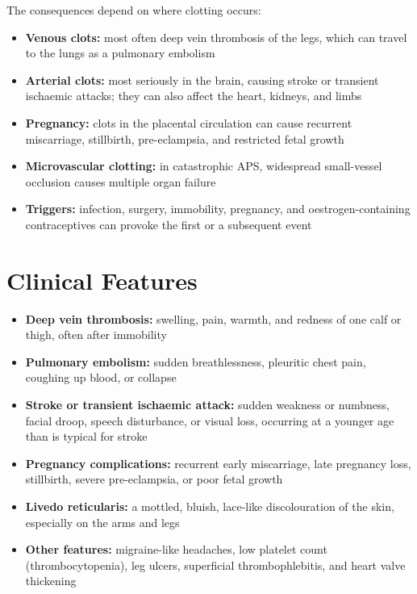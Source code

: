 The consequences depend on where clotting occurs:

\begin{itemize}
    \item \textbf{Venous clots:} most often deep vein thrombosis of the legs, which can travel to the lungs as a pulmonary embolism
    \item \textbf{Arterial clots:} most seriously in the brain, causing stroke or transient ischaemic attacks; they can also affect the heart, kidneys, and limbs
    \item \textbf{Pregnancy:} clots in the placental circulation can cause recurrent miscarriage, stillbirth, pre-eclampsia, and restricted fetal growth
    \item \textbf{Microvascular clotting:} in catastrophic APS, widespread small-vessel occlusion causes multiple organ failure
    \item \textbf{Triggers:} infection, surgery, immobility, pregnancy, and oestrogen-containing contraceptives can provoke the first or a subsequent event
\end{itemize}

\section*{Clinical Features}
\begin{itemize}
    \item \textbf{Deep vein thrombosis:} swelling, pain, warmth, and redness of one calf or thigh, often after immobility
    \item \textbf{Pulmonary embolism:} sudden breathlessness, pleuritic chest pain, coughing up blood, or collapse
    \item \textbf{Stroke or transient ischaemic attack:} sudden weakness or numbness, facial droop, speech disturbance, or visual loss, occurring at a younger age than is typical for stroke
    \item \textbf{Pregnancy complications:} recurrent early miscarriage, late pregnancy loss, stillbirth, severe pre-eclampsia, or poor fetal growth
    \item \textbf{Livedo reticularis:} a mottled, bluish, lace-like discolouration of the skin, especially on the arms and legs
    \item \textbf{Other features:} migraine-like headaches, low platelet count (thrombocytopenia), leg ulcers, superficial thrombophlebitis, and heart valve thickening
\end{itemize}


